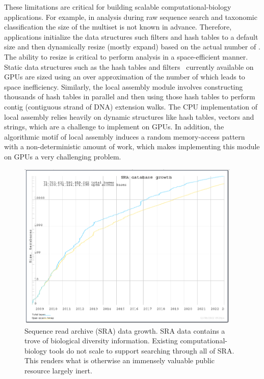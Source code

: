 These limitations are critical for building scalable computational-biology applications. For example, in \kmer analysis during raw sequence search and taxonomic classification the size of the \kmer multiset is not known in advance. Therefore, applications initialize the data structures such filters and hash tables to a default size and then dynamically resize (mostly expand) based on the actual number of \kmers. The ability to resize is critical to perform \kmer analysis in a space-efficient manner. Static data structures such as the hash tables and filters~\cite{GeilFO18} currently available on GPUs are sized using an over approximation of the number of \kmers which leads to space inefficiency.
Similarly, the local assembly module involves constructing thousands of hash tables in parallel and then using those hash tables to perform contig (contiguous strand of DNA) extension walks. The CPU implementation of local assembly relies heavily on dynamic
structures like hash tables, vectors and strings, which are a challenge to implement on GPUs. In addition, the algorithmic motif of local assembly induces a random memory-access pattern with a non-deterministic amount of work, which makes implementing this module on GPUs a very challenging problem.

\begin{figure}
\centering
\includegraphics[width=0.95\textwidth]{images/SRA_data_growth.png}
\caption{Sequence read archive (SRA) data growth. SRA data contains a trove of biological diversity information. Existing computational-biology tools do not scale to support searching through all of SRA. This renders what is otherwise an immensely valuable public resource largely inert.}
\label{fig:sra_data}
\end{figure}



